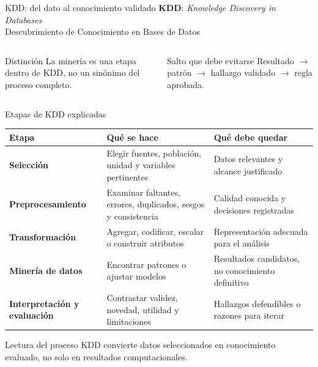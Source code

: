 \documentclass[aspectratio=169,11pt]{beamer}
\newcommand{\br}{\\}
\begin{document}
\begin{frame}{KDD: del dato al conocimiento validado}
  \centering
  \small\textbf{KDD}: \textit{Knowledge Discovery in Databases}\\
  \textcolor{UAPGray}{Descubrimiento de Conocimiento en Bases de Datos}
  \vspace{0.35em}
  \centering
  \vspace{0.35em}
  \begin{columns}[T]
      \begin{block}{Distinción}
        La minería es una etapa dentro de KDD, no un sinónimo del proceso completo.
      \end{block}
      \begin{block}{Salto que debe evitarse}
        Resultado $\rightarrow$ patrón $\rightarrow$ hallazgo validado $\rightarrow$ regla aprobada.
      \end{block}
  \end{columns}
\end{frame}

\begin{frame}{Etapas de KDD explicadas}
  \scriptsize
  \begin{tabularx}{\textwidth}{>{\bfseries}p{} X X}
    \toprule
    Etapa & Qué se hace & Qué debe quedar \\
    \midrule
    Selección & Elegir fuentes, población, unidad y variables pertinentes & Datos relevantes y alcance justificado \\
    Preprocesamiento & Examinar faltantes, errores, duplicados, sesgos y consistencia & Calidad conocida y decisiones registradas \\
    Transformación & Agregar, codificar, escalar o construir atributos & Representación adecuada para el análisis \\
    Minería de datos & Encontrar patrones o ajustar modelos & Resultados candidatos, no conocimiento definitivo \\
    Interpretación y evaluación & Contrastar validez, novedad, utilidad y limitaciones & Hallazgos defendibles o razones para iterar \\
    \bottomrule
  \end{tabularx}
  \vfill
  \begin{block}{Lectura del proceso}
    KDD convierte datos seleccionados en conocimiento evaluado, no solo en resultados computacionales.
  \end{block}
\end{frame}
\end{document}
